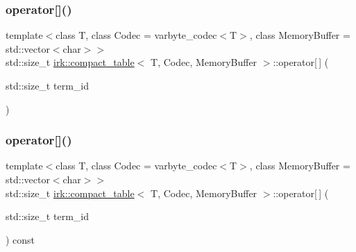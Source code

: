 \subsubsection{\texorpdfstring{operator[]()}{operator[]()}\hspace{0.1cm}{\footnotesize\ttfamily [1/2]}}
{\footnotesize\ttfamily template$<$class T, class Codec = varbyte\+\_\+codec$<$\+T$>$, class Memory\+Buffer = std\+::vector$<$char$>$$>$ \\
std\+::size\+\_\+t \mbox{\hyperlink{classirk_1_1compact__table}{irk\+::compact\+\_\+table}}$<$ T, Codec, Memory\+Buffer $>$\+::operator\mbox{[}$\,$\mbox{]} (\begin{DoxyParamCaption}\item[{std\+::size\+\_\+t}]{term\+\_\+id }\end{DoxyParamCaption})\hspace{0.3cm}{\ttfamily [inline]}}

\mbox{\label{classirk_1_1compact__table_a0078a7510ab8cb5ace71e69c1bc24afa}} 
\subsubsection{\texorpdfstring{operator[]()}{operator[]()}\hspace{0.1cm}{\footnotesize\ttfamily [2/2]}}
{\footnotesize\ttfamily template$<$class T, class Codec = varbyte\+\_\+codec$<$\+T$>$, class Memory\+Buffer = std\+::vector$<$char$>$$>$ \\
std\+::size\+\_\+t \mbox{\hyperlink{classirk_1_1compact__table}{irk\+::compact\+\_\+table}}$<$ T, Codec, Memory\+Buffer $>$\+::operator\mbox{[}$\,$\mbox{]} (\begin{DoxyParamCaption}\item[{std\+::size\+\_\+t}]{term\+\_\+id }\end{DoxyParamCaption}) const\hspace{0.3cm}{\ttfamily [inline]}}

\mbox{\label{classirk_1_1compact__table_a868e5c254b459b6ab831681d5e9f34c1}} 
